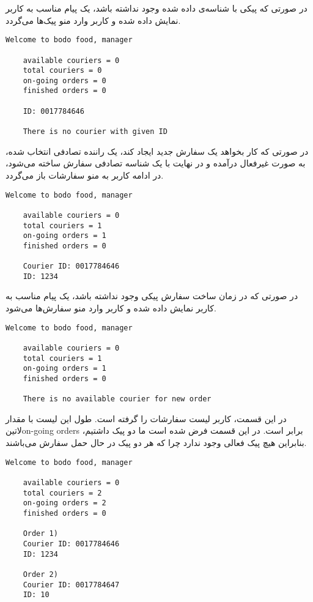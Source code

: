 \documentclass[../main.tex]{subfiles}
\begin{document}
در صورتی که پیکی با شناسه‌ی داده شده وجود نداشته باشد، یک پیام مناسب به کاربر نمایش داده شده و کاربر وارد منو پیک‌ها می‌گردد.

\begin{latin}
\begin{lstlisting}[]
    Welcome to bodo food, manager

    available couriers = 0
    total couriers = 0
    on-going orders = 0
    finished orders = 0

    ID: 0017784646

    There is no courier with given ID
\end{lstlisting}
\end{latin}

در صورتی که کار بخواهد یک سفارش جدید ایجاد کند، یک راننده تصادفی انتخاب شده، به صورت غیرفعال درآمده و در نهایت با یک شناسه تصادفی سفارش ساخته می‌شود، در ادامه کاربر به منو سفارشات باز می‌گردد.

\begin{latin}
\begin{lstlisting}[]
    Welcome to bodo food, manager

    available couriers = 0
    total couriers = 1
    on-going orders = 1
    finished orders = 0

    Courier ID: 0017784646
    ID: 1234

\end{lstlisting}
\end{latin}

در صورتی که در زمان ساخت سفارش پیکی وجود نداشته باشد، یک پیام مناسب به کاربر نمایش داده شده و کاربر وارد منو سفارش‌ها می‌شود.

\begin{latin}
\begin{lstlisting}[]
    Welcome to bodo food, manager

    available couriers = 0
    total couriers = 1
    on-going orders = 1
    finished orders = 0

    There is no available courier for new order
\end{lstlisting}
\end{latin}

در این قسمت، کاربر لیست سفارشات را گرفته است. طول این لیست با مقدار ‌لاتین{on-going orders} برابر است. در این قسمت فرض شده است ما دو پیک داشتیم، بنابراین هیچ پیک فعالی وجود ندارد چرا که هر دو پیک در حال حمل سفارش می‌باشند.

\begin{latin}
\begin{lstlisting}[]
    Welcome to bodo food, manager

    available couriers = 0
    total couriers = 2
    on-going orders = 2
    finished orders = 0

    Order 1)
    Courier ID: 0017784646
    ID: 1234

    Order 2)
    Courier ID: 0017784647
    ID: 10

\end{lstlisting}
\end{latin}
\end{document}
